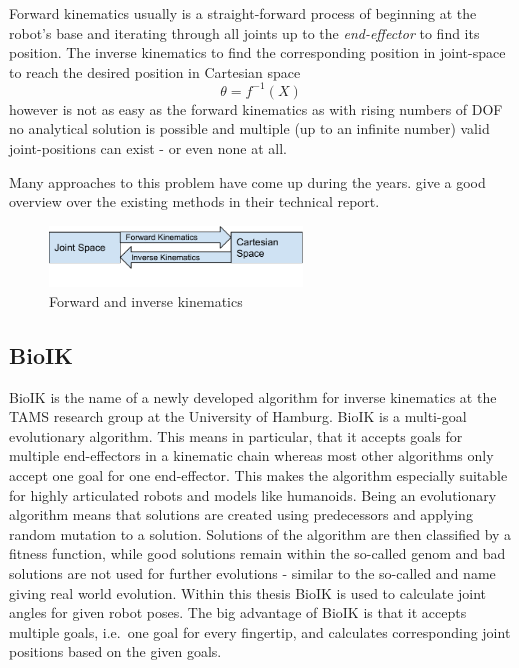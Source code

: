 Forward kinematics usually is a straight-forward process of beginning at the robot's base and iterating through all joints up to the \textit{end-effector} to find its position. The inverse kinematics to find the corresponding position in joint-space to reach the desired position in Cartesian space
\begin{equation*}
\theta = f^{-1}(X)
\end{equation*}
however is not as easy as the forward kinematics as with rising numbers of DOF no analytical solution is possible and multiple (up to an infinite number) valid joint-positions can exist - or even none at all\cite{DextquotesingleSouza}.

Many approaches to this problem have come up during the years. \citeauthor{andreasaristidou2009inverse} give a good overview over the existing methods in their technical report\cite{DextquotesingleSouza}.

\begin{figure}
	\caption{Forward and inverse kinematics\label{fig:basics:kinematics}}
	\begin{center}
		\includegraphics[width=0.6\textwidth]{assets/chpt_basics/Kinematics.pdf}
	\end{center}
\end{figure}

\subsection{BioIK}
\label{sec:bioik}
BioIK is the name of a newly developed algorithm for inverse kinematics at the TAMS research group at the University of Hamburg\cite{Starke2017}. BioIK is a multi-goal evolutionary algorithm. This means in particular, that it accepts goals for multiple end-effectors in a kinematic chain whereas most other algorithms only accept one goal for one end-effector. This makes the algorithm especially suitable for highly articulated robots and models like humanoids\cite{Starkea2017}. Being an evolutionary algorithm means that solutions are created using predecessors and applying random mutation to a solution. Solutions of the algorithm are then classified by a fitness function, while good solutions remain within the so-called genom and bad solutions are not used for further evolutions\cite{Ruppel17} - similar to the so-called and name giving real world evolution. Within this thesis BioIK is used to calculate joint angles for given robot poses. The big advantage of BioIK is that it accepts multiple goals, i.e.~one goal for every fingertip, and calculates corresponding joint positions based on the given goals.

